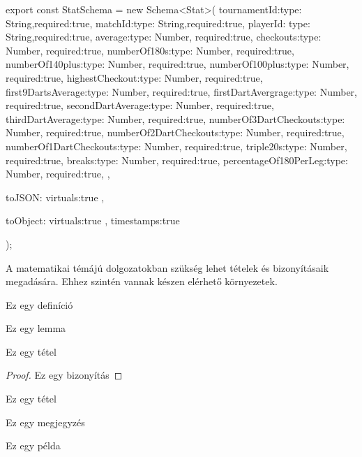 \begin{cpp}
export const StatSchema = new Schema<Stat>(
    {
        tournamentId:{type: String,required:true},
        matchId:{type: String,required:true},
        playerId: {type: String,required:true},
        average:{type: Number, required:true},
        checkouts:{type: Number, required:true},
        numberOf180s:{type: Number, required:true},
        numberOf140plus:{type: Number, required:true},
        numberOf100plus:{type: Number, required:true},
        highestCheckout:{type: Number, required:true},
        first9DartsAverage:{type: Number, required:true},
        firstDartAvergrage:{type: Number, required:true},
        secondDartAverage:{type: Number, required:true},
        thirdDartAverage:{type: Number, required:true},
        numberOf3DartCheckouts:{type: Number, required:true},
        numberOf2DartCheckouts:{type: Number, required:true},
        numberOf1DartCheckouts:{type: Number, required:true},
        triple20s:{type: Number, required:true},
        breaks:{type: Number, required:true},
        percentageOf180PerLeg:{type: Number, required:true},
    },{
        toJSON:{
            virtuals:true
        },

        toObject:{
            virtuals:true
        },
        timestamps:true
    }
);
\end{cpp}


A matematikai témájú dolgozatokban szükség lehet tételek és bizonyításaik megadására.
Ehhez szintén vannak készen elérhető környezetek.

\begin{definition}
Ez egy definíció
\end{definition}

\begin{lemma}
Ez egy lemma
\end{lemma}

\begin{theorem}
Ez egy tétel
\end{theorem}

\begin{proof}
Ez egy bizonyítás
\end{proof}

\begin{corollary}
Ez egy tétel
\end{corollary}

\begin{remark}
Ez egy megjegyzés
\end{remark}

\begin{example}
Ez egy példa
\end{example}
